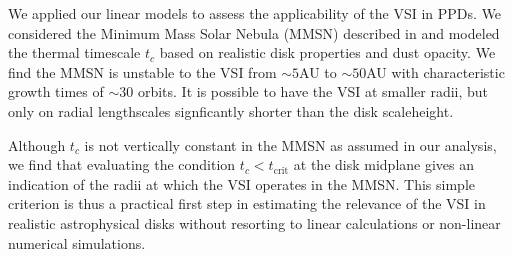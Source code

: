 We applied our linear models to assess the applicability of the VSI in
PPDs. We considered the Minimum Mass Solar Nebula 
(MMSN) described in \cite{chiang10} and   
modeled the thermal timescale $t_c$ based on realistic
disk properties and dust opacity. 
We find the MMSN is unstable to the VSI 
from $\sim 5$AU to $\sim50$AU with characteristic growth times of
$\sim 30$ orbits. It is possible to have the VSI at smaller
radii, but only on radial lengthscales signficantly shorter
than the disk scaleheight. %

Although $t_c$ is not vertically constant in the 
MMSN as assumed in our analysis, we find that evaluating the condition
$t_c< t_\mathrm{crit}$ at the disk midplane gives an indication of the
radii at which the VSI operates in the MMSN. This simple criterion is
thus a practical first step in estimating the relevance of the VSI in
realistic astrophysical disks without resorting to linear
calculations or non-linear numerical simulations.   

 



